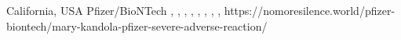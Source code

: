           {
            California, USA
          }
          {
          }
          {
            Pfizer/BioNTech
          }
          {
          }
          {
            ,
            ,
            ,
            ,
            ,
            ,
            ,
            ,
          }
          {
            https://nomoresilence.world/pfizer-biontech/mary-kandola-pfizer-severe-adverse-reaction/
          }

